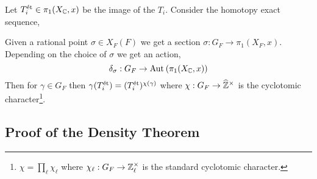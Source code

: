 \documentclass[12pt]{article}
\begin{document}
\begin{prop}[Deligne]
Let $T_i^{\text{\'{e}t}} \in \pi_1(X_{\mathbb{C}}, x)$ be the image of the $T_i$. Consider the homotopy exact sequence,
\begin{center}
\end{center}
Given a rational point $\sigma \in X_F(F)$ we get a section $\sigma : G_F \to \pi_1(X_F, x)$. Depending on the choice of $\sigma$ we get an action,
\[ \delta_{\sigma} : G_F \to \mathrm{Aut}_{} \left( \pi_1(X_{\mathbb{C}}, x) \right) \]
Then for $\gamma \in G_F$ then $\gamma(T_i^{\text{\'{e}t}}) = (T_i^{\text{\'{e}t}})^{\chi(\gamma)}$ where $\chi : G_F \to \widehat{\mathbb{Z}}^\times$ is the cyclotomic character\footnote{$\chi = \prod_{\ell} \chi_{\ell}$ where $\chi_{\ell} : G_F \to \mathbb{Z}_\ell^\times$ is the standard cyclotomic character.}. 
\end{prop}

\newcommand{\smooth}{\mathrm{smooth}}

\subsection{Proof of the Density Theorem}
\end{document}
